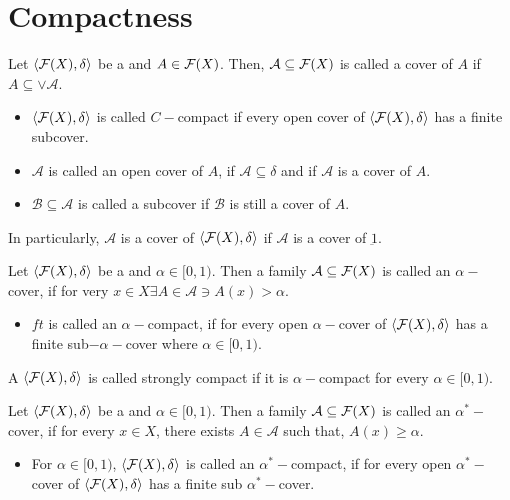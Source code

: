 \documentclass[../main-sheet.tex]{subfiles}
\begin{document}
\chapter{Compactness}
\begin{defn}
    Let \(\langle \mathcal{F}(X), \delta \rangle\) be a \fts\s and \(A\in\mathcal{F}(X) \). Then, \(\mathcal{A }\subseteq \mathcal{F}(X) \) is called a cover of \(A \) if \(A\subseteq \vee \mathcal{A }\).
    \begin{itemize}
        \item \(\langle \mathcal{F}(X), \delta \rangle\) is called \(C-\)compact if every open cover of \(\langle \mathcal{F}(X), \delta \rangle\) has a finite subcover.
        \item \(\mathcal{A }\) is called an open cover of \(A \), if \(\mathcal{A }\subseteq \delta\) and if \(\mathcal{A }\) is a cover of \(A \).
        \item \(\mathcal{B }\subseteq \mathcal{A }\) is called a subcover if \(\mathcal{B }\) is still a cover of \(A \).
    \end{itemize}
    In particularly, \(\mathcal{ A }\) is a cover of \(\langle \mathcal{F}(X), \delta \rangle\) if \(\mathcal{ A }\) is a cover of \(\underbar{1}\).
\end{defn}
\begin{defn}
    Let \(\langle \mathcal{F}(X), \delta \rangle\) be a \fts\s and \(\alpha\in[0,1)\). Then a family \(\mathcal{A }\subseteq \mathcal{F}(X)\) is called an \(\alpha-\)cover, if for very \(x\in X \exists A\in\mathcal{A } \ni A(x)>\alpha\).
    \begin{itemize}
        \item \(ft\) is called an \(\alpha-\)compact, if for every open \(\alpha-\)cover of \(\langle \mathcal{F}(X), \delta \rangle\) has a finite sub\(-\alpha-\)cover where \(\alpha\in[0,1)\).
    \end{itemize}
\end{defn}
\begin{defn}
    A \fts\s\(\langle \mathcal{F}(X), \delta \rangle\) is called strongly compact if it is \(\alpha-\)compact for every \(\alpha\in[0,1)\).
\end{defn}
\begin{defn}
    Let \(\langle \mathcal{F}(X), \delta \rangle\) be a \fts\s and \(\alpha\in[0,1)\). Then a family \(\mathcal{A }\subseteq\mathcal{F}(X)\) is called an \(\alpha^*-\)cover, if for every \(x\in X \), there exists \(A\in \mathcal{A }\) such that, \(A(x)\geq \alpha\).
    \begin{itemize}
        \item For \(\alpha\in[0,1)\), \(\langle \mathcal{F}(X), \delta \rangle\) is called an \(\alpha^*-\)compact, if for every open \(\alpha^*-\)cover of \(\langle \mathcal{F}(X), \delta \rangle\) has a finite sub \(\alpha^*-\)cover.
    \end{itemize}
\end{defn}
\end{document}
